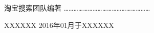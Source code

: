  \vspace*{0.0cm}
\thispagestyle{empty}
\vspace*{2.2cm}
\centerline{\hei{\color{darkblue}{第一版序}}}\vspace{2cm}

淘宝搜索团队编著
………………………………………………

\vspace{2cm}

\hfill XXXXXX\hspace{0.2em}
\hfill 2016年01月于XXXXXX\hspace{0.2em}
